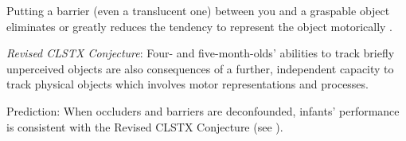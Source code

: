 \documentclass[12pt]{extarticle}
\begin{document}
\begin{multicols*}{3}
Putting a barrier (even a translucent one) between you and a graspable object eliminates or greatly reduces the tendency to represent the object motorically \citep[e.g.][]{costantini:2010_where}.

\emph{Revised CLSTX Conjecture}:
Four- and five-month-olds' abilities to track briefly unperceived objects are also consequences of a further, independent capacity to track physical objects which involves motor representations and processes.

Prediction: When occluders and barriers are deconfounded, infants’ performance is consistent with the Revised CLSTX Conjecture (see \citealp{mccurry:2009_beyond}).

\vfill


\footnotesize


\end{multicols*}
\end{document}
